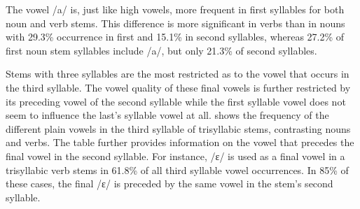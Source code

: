 The vowel /a/ is, just like high vowels, more frequent in first syllables for both noun and verb stems. This difference is more significant in verbs than in nouns with 29.3\% occurrence in first and 15.1\% in second syllables, whereas 27.2\% of first noun stem syllables include /a/, but only 21.3\% of second syllables.

Stems with three syllables are the most restricted as to the vowel that occurs in the third syllable. The vowel quality of these final vowels is further restricted by its preceding vowel of the second syllable while the first syllable vowel does not seem to influence the last's syllable vowel at all.  shows the frequency of the different plain vowels in the third syllable of trisyllabic stems, contrasting nouns and verbs. The table further provides information on the vowel that precedes the final vowel in the second syllable. For instance, /ɛ/ is used as a final vowel in a trisyllabic verb stems in 61.8\% of all third syllable vowel occurrences. In 85\% of these cases, the final /ɛ/ is preceded by the same vowel in the stem's second syllable.

\begin{table}
\caption{Frequency of $\sigma$3 plain vowels in trisyllabic stems}
\label{Tab:TriV}
\end{table}

